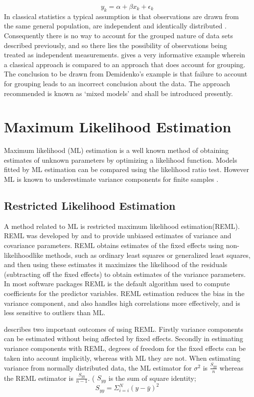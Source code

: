\documentclass[12pt, a4paper]{report}
\begin{document}
\begin{equation}
y_{k} = \alpha + \beta x_{k}+ \epsilon_{k}
\end{equation}
In classical statistics a typical assumption is that observations
are drawn from the same general population, are independent and
identically distributed \citep{Demi}. Consequently there is no way
to account for the grouped nature of data sets described
previously, and so there lies the possibility of observations
being treated as independent measurements. \citet[pg.3]{Demi}
gives a very informative example wherein a classical approach is
compared to an approach that does account for grouping. The
conclusion to be drawn from Demidenko's example is that failure to
account for grouping leads to an incorrect conclusion about the
data. The approach recommended is known as `mixed models' and
shall be introduced presently.

\newpage
\section{Maximum Likelihood Estimation}
Maximum likelihood (ML) estimation is a well known method of
obtaining estimates of unknown parameters by optimizing a
likelihood function. Models fitted by ML estimation can be
compared using the likelihood ratio test. However ML is known to
underestimate variance components for finite samples \citep{Demi}.

\subsection{Restricted Likelihood Estimation}

A method related to ML is restricted maximum likelihood
estimation(REML). REML was developed by \citet*{PT71} and
\citet{Harville} to provide unbiased estimates of variance and
covariance parameters. REML obtains estimates of the fixed effects
using non-likelihoodlike methods, such as ordinary least squares
or generalized least squares, and then using these estimates it
maximizes the likelihood of the residuals (subtracting off the
fixed effects) to obtain estimates of the variance parameters. In
most software packages REML is the default algorithm used to
compute coefficients for the predictor variables. REML estimation
reduces the bias in the variance component, and also handles high
correlations more effectively, and is less sensitive to outliers
than ML.

\citet{McCullSearle} describes two important outcomes of using
REML. Firstly variance components can be estimated without being
affected by fixed effects. Secondly in estimating variance
components with REML, degrees of freedom for the fixed effects can
be taken into account implicitly, whereas with ML they are not.
When estimating variance from normally distributed data, the ML
estimator for $\sigma^{2}$ is $\frac{S_{yy}}{n}$ whereas the REML
estimator is $\frac{S_{yy}}{n-1}$. ( $S_{yy}$ is the sum of square
identity;
\begin{equation}
S_{yy} = \Sigma_{i=i}^{N} (y-\bar{y})^{2}
\end{equation}
\end{document}
